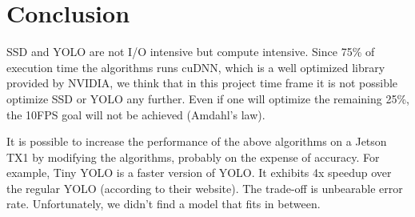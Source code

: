 \section{Conclusion}
\label{sec:conclusion}

SSD and YOLO are not I/O intensive but compute intensive. Since 75\% of execution time the algorithms runs cuDNN, which is a well optimized library provided by NVIDIA, we think that in this project time frame it is not possible optimize SSD or YOLO any further. Even if one will optimize the remaining 25\%, the 10FPS goal will not be achieved (Amdahl's law).

It is possible to increase the performance of the above algorithms on a Jetson TX1 by modifying the algorithms, probably on the expense of accuracy. For example, Tiny YOLO is a faster version of YOLO. It exhibits 4x speedup over the regular YOLO (according to their website). The trade-off is unbearable error rate. Unfortunately, we didn't find a model that fits in between.

